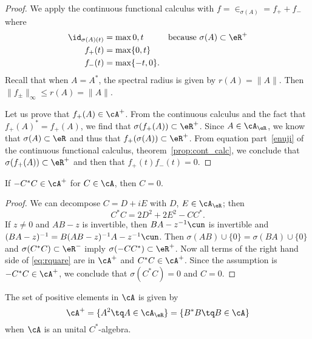 \begin{proof}
We apply the continuous functional calculus with $f=\in_{\sigma(A)}=f_++f_-$ where
\begin{equation} \label{eq:rrdeux}
\begin{aligned}
  \id_{\sigma(A)(t)}&=\max{0,t}&&\textrm{because $\sigma(A)\subset\eR^+$}\\
  f_+(t)&=\max\{ 0,t \}\\
  f_-(t)&=\max\{ -t,0 \}.
\end{aligned}
\end{equation}
Recall that when $A=A^*$, the spectral radius is given by $r(A)=\| A \|$. Then $\| f_{\pm} \|_{\infty}\leq r(A)=\| A \|$.

Let us prove that $f_+(A)\in\cA^+$. From the continuous calculus and the fact that $f_+(A)^*=f_+(A)$, we find that $\sigma(f_+(A))\subset\eR^+$. Since $A\in\cA_{\eR}$, we know that $\sigma(A)\subset\eR$ and thus that $f_+(\sigma(A))\subset\eR^+$. From equation part~\ref{enuji} of the continuous functional calculus, theorem~\ref{prop:cont_calc}, we conclude that $\sigma(f_+(A))\subset\eR^+$ and then that $f_+(t)f_-(t)=0$.
\end{proof}

\begin{lemma} \label{lem:rtrois}
If $-C^*C\in\cA^+$ for $C\in\cA$, then $C=0$.
\end{lemma}

\begin{proof}
We can decompose $C=D+iE$ with $D$, $E\in\cA_{\eR}$; then
\begin{equation}  \label{eq:rquare}
C^*C=2D^2+2E^2-CC^*.
\end{equation}
 If $z\neq 0$ and $AB-z$ is invertible, then $BA-z^{-1}\cun$ is invertible and $(BA-z)^{-1}=B(AB-z)^{-1}A-z^{-1}\cun$. Then $\sigma(AB)\cup\{ 0 \}=\sigma(BA)\cup\{ 0 \}$ and $\sigma(C^*C)\subset\eR^-$ imply $\sigma(-CC^*)\subset\eR^+$. Now all terms of the right hand side of \eqref{eq:rquare} are in $\cA^+$ and $C^*C\in\cA^+$. Since the assumption is $-C^*C\in\cA^+$, we conclude that $\sigma(C^*C)=0$ and $C=0$.
\end{proof}


\begin{theorem}     \label{ThoElsPositifsBBstar}
The set of positive elements in $\cA$ is given by
\begin{equation}
\cA^+=\{ A^2\tq A\in\cA_{\eR} \}=\{ B^*B\tq B\in\cA \}
\end{equation}
when $\cA$ is an unital $C^*$-algebra.
\end{theorem}

